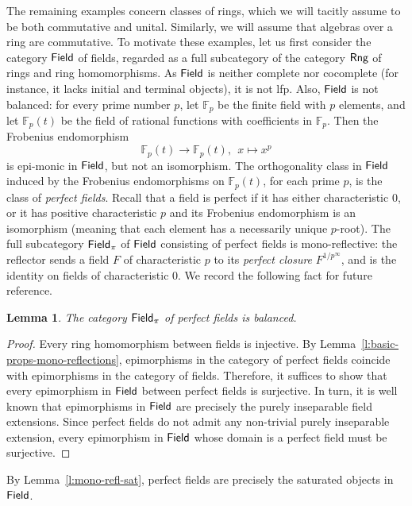 \documentclass[a4paper,10pt,reqno]{amsart}
\newtheorem{lemma}[theorem]{Lemma}
\theoremstyle{definition}
\theoremstyle{remark}
\newcommand{\Rng}{{\sf Rng}}								%
\newcommand{\Field}{{\sf Field}}							%
\begin{document}
\medskip
The remaining examples concern classes of rings, which we will tacitly assume to be both commutative and unital. Similarly, we will assume that algebras over a ring are commutative. To motivate these examples, let us first consider the category $\Field$ of fields, regarded as a full subcategory of the category $\Rng$ of rings and ring homomorphisms. As $\Field$ is neither complete nor cocomplete (for instance, it lacks initial and terminal objects), it is not lfp. Also, $\Field$ is not balanced: for every prime number $p$, let $\mathbb{F}_{p}$ be the finite field with $p$ elements, and let $\mathbb{F}_{p}(t)$ be the field of rational functions with coefficients in $\mathbb{F}_{p}$. Then the Frobenius endomorphism
\[
\mathbb{F}_{p}(t) \to \mathbb{F}_{p}(t), \ \ x\mapsto x^{p}
\]
is epi-monic in $\Field$, but not an isomorphism. The orthogonality class in $\Field$ induced by the Frobenius endomorphisms on $\mathbb{F}_{p}(t)$, for each prime $p$, is the class of \emph{perfect fields}. Recall that a field is perfect if it has either characteristic $0$, or it has positive characteristic $p$ and its Frobenius endomorphism is an isomorphism (meaning that each element has a necessarily unique $p$-root). The full subcategory $\Field_{\pi}$ of $\Field$ consisting of perfect fields is mono-reflective: the reflector sends a field $F$ of characteristic $p$ to its \emph{perfect closure} $F^{1/p^{\infty}}$, and is the identity on fields of characteristic $0$. We record the following fact for future reference.
%
\begin{lemma}\label{l:perfect-fields-balanced}
The category $\Field_{\pi}$ of perfect fields is balanced. 
\end{lemma}
%
\begin{proof}
Every ring homomorphism between fields is injective. By Lemma~\ref{l:basic-props-mono-reflections}, epimorphisms in the category of perfect fields coincide with epimorphisms in the category of fields. Therefore, it suffices to show that every epimorphism in $\Field$ between perfect fields is surjective. In turn, it is well known that epimorphisms in $\Field$ are precisely the purely inseparable field extensions. Since perfect fields do not admit any non-trivial purely inseparable extension, every epimorphism in $\Field$ whose domain is a perfect field must be surjective.
\end{proof}


By Lemma~\ref{l:mono-refl-sat}, perfect fields are precisely the saturated objects in $\Field$.
\end{document}
